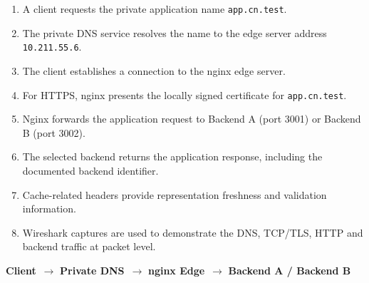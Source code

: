\documentclass[12pt,a4paper]{article}
\begin{document}
\begin{enumerate}
  \item A client requests the private application name \texttt{app.cn.test}.
  \item The private DNS service resolves the name to the edge server address \texttt{10.211.55.6}.
  \item The client establishes a connection to the nginx edge server.
  \item For HTTPS, nginx presents the locally signed certificate for \texttt{app.cn.test}.
  \item Nginx forwards the application request to Backend A (port 3001) or Backend B (port 3002).
  \item The selected backend returns the application response, including the documented backend identifier.
  \item Cache-related headers provide representation freshness and validation information.
  \item Wireshark captures are used to demonstrate the DNS, TCP/TLS, HTTP and backend traffic at packet level.
\end{enumerate}

\begin{tcolorbox}[colback=lightblue,colframe=navy,boxrule=0.5pt]
\centering
\textbf{Client}\ $\rightarrow$ \textbf{Private DNS}\ $\rightarrow$ \textbf{nginx Edge}\ $\rightarrow$ \textbf{Backend A / Backend B}
\end{tcolorbox}

\clearpage
\end{document}
